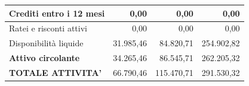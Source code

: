 \documentclass[12pt, a4paper]{article}
\begin{document}
\begin{center}
\begin{tabular}{|l|r|r|r|}
        Crediti entro i 12 mesi                                       & 0,00                                                          & 0,00                                                          & 0,00                                                          \\ \hline
        Ratei e risconti attivi                                       & 0,00                                                          & 0,00                                                          & 0,00                                                          \\ \hline
        Disponibilità liquide                                         & 31.985,46                                                     & 84.820,71                                                     & 254.902,82                                                    \\ \hline
        \rowcolor[HTML]{EFEFEF}
        \textbf{Attivo circolante}                                    & 34.265,46                                                     & 86.545,71                                                     & 262.205,32                                                    \\ \hline
        \rowcolor[HTML]{CBCEFB}
        \textbf{TOTALE ATTIVITA'}                                     & 66.790,46                                                     & 115.470,71                                                    & 291.530,32                                                    \\ \hline
    \end{tabular}
\end{center}\medskip
\end{document}
